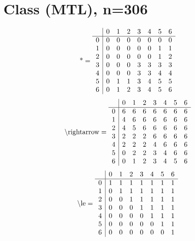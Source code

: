\documentclass[11pt]{article}
\begin{document}
\section{Class (MTL), n=306}
\[\text{*} = 
\begin{array}{r | r r r r r r r}
 & 0 & 1 & 2 & 3 & 4 & 5 & 6 \\ \hline
0 & 0 & 0 & 0 & 0 & 0 & 0 & 0 \\
1 & 0 & 0 & 0 & 0 & 0 & 1 & 1 \\
2 & 0 & 0 & 0 & 0 & 0 & 1 & 2 \\
3 & 0 & 0 & 0 & 3 & 3 & 3 & 3 \\
4 & 0 & 0 & 0 & 3 & 3 & 4 & 4 \\
5 & 0 & 1 & 1 & 3 & 4 & 5 & 5 \\
6 & 0 & 1 & 2 & 3 & 4 & 5 & 6 \\
\end{array}
\]
\[\text{\textbackslash rightarrow} = 
\begin{array}{r | r r r r r r r}
 & 0 & 1 & 2 & 3 & 4 & 5 & 6 \\ \hline
0 & 6 & 6 & 6 & 6 & 6 & 6 & 6 \\
1 & 4 & 6 & 6 & 6 & 6 & 6 & 6 \\
2 & 4 & 5 & 6 & 6 & 6 & 6 & 6 \\
3 & 2 & 2 & 2 & 6 & 6 & 6 & 6 \\
4 & 2 & 2 & 2 & 4 & 6 & 6 & 6 \\
5 & 0 & 2 & 2 & 3 & 4 & 6 & 6 \\
6 & 0 & 1 & 2 & 3 & 4 & 5 & 6 \\
\end{array}
\]
\[\text{\textbackslash le} = 
\begin{array}{r | r r r r r r r}
 & 0 & 1 & 2 & 3 & 4 & 5 & 6 \\ \hline
0 & 1 & 1 & 1 & 1 & 1 & 1 & 1 \\
1 & 0 & 1 & 1 & 1 & 1 & 1 & 1 \\
2 & 0 & 0 & 1 & 1 & 1 & 1 & 1 \\
3 & 0 & 0 & 0 & 1 & 1 & 1 & 1 \\
4 & 0 & 0 & 0 & 0 & 1 & 1 & 1 \\
5 & 0 & 0 & 0 & 0 & 0 & 1 & 1 \\
6 & 0 & 0 & 0 & 0 & 0 & 0 & 1 \\
\end{array}
\]
\end{document}
